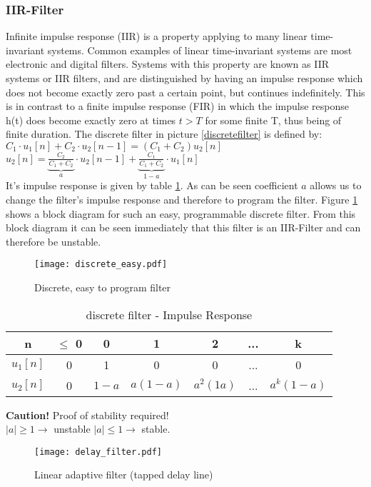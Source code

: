 \subsubsection{IIR-Filter}
Infinite impulse response (IIR) is a property applying to many linear time-invariant systems. Common examples of linear time-invariant systems are most electronic and digital filters. Systems with this property are known as IIR systems or IIR filters, and are distinguished by having an impulse response which does not become exactly zero past a certain point, but continues indefinitely. This is in contrast to a finite impulse response (FIR) in which the impulse response h(t) does become exactly zero at times $t > T$ for some finite T, thus being of finite duration.
The discrete filter in picture \ref{discretefilter} is defined by:\\ 
$C_1\cdot u_1[n] + C_2\cdot u_2[n-1] = (C_1+C_2 )u_2[n]$\\ 
$u_2[n]= \underbrace{\frac{C_2}{C_1+C_2}}_{a}\cdot u_2[n-1] + \underbrace{\frac{C_1}{C_1+C_2}}_{1-a}\cdot u_1[n]$\\
It's impulse response is given by table \ref{tab:prog_filter_Impulse_Resp}. As can be seen coefficient $a$ allows us to change the filter's impulse response and therefore to program the filter. Figure \ref{discreteeasy} shows a block diagram for such an easy, programmable discrete filter. From this block diagram it can be seen immediately that this filter is an IIR-Filter and can therefore be unstable.
\begin{figure}[H]
	\centering
	\texttt{[image: discrete\_easy.pdf]}
	\caption{Discrete, easy to program filter}
	\label{discreteeasy} 
\end{figure}

\begin{table}
	\caption{discrete filter - Impulse Response }	
	\label{tab:prog_filter_Impulse_Resp}
	\centering
\begin{tabular}[H]{|c|cccccc|}
\hline
	n & $\leq$ 0 & 0 &1 &2 & ... &k\\
	\hline
	$u_1[n]$& 0 & 1 & 0 & 0 & ... &0\\
	$u_2[n]$& 0 & $1-a$ & $a(1-a)$&$ a^2(1a) $& ... & $a^k (1-a)$\\
	\hline
\end{tabular}
\end{table}

\textbf{Caution!} Proof of stability required! \\ $|a| \geq 1 \rightarrow $ unstable \pfeil $|a| \leq 1 \rightarrow$ stable.
\begin{figure}[H]
	\centering
	\texttt{[image: delay\_filter.pdf]}
	\caption{Linear adaptive filter (tapped delay line)}
	\label{delayfilter} 
\end{figure}

